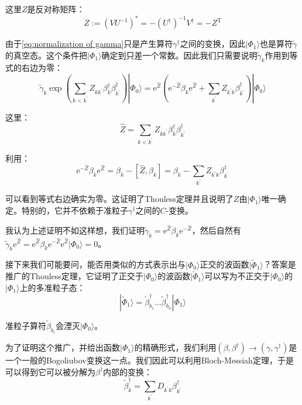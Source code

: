 这里$Z$是反对称矩阵：
\begin{equation}
Z:=(VU^{-1})^{*}=-(U^{\dagger})^{-1}V^{\dagger}=-Z^{\mathrm{T}}\label{eq:Z UV}
\end{equation}

由于\ref{eq:normalization of gamma}只是产生算符$\gamma^{\dagger}$之间的变换，因此$|\Phi_{1}\rangle$也是算符$\tilde{\gamma}$的真空态。这个条件把$|\Phi_{1}\rangle$确定到只差一个常数。因此我们只需要说明$\tilde{\gamma}_{k}$作用到等式的右边为零：
\[
\tilde{\gamma}_{k}\exp\left(\sum_{k<k^{\prime}}Z_{kk^{\prime}}\beta^{\dagger}_{k}\beta^{\dagger}_{k^{\prime}}\right)|\Phi_{0}\rangle=\mathrm{e}^{\hat{Z}}\left(\mathrm{e}^{-\hat{Z}}\beta_{k}\mathrm{e}^{\hat{Z}}+\sum_{k^{\prime}}Z_{k^{\prime}k}\beta^{\dagger}_{k^{\prime}}\right)|\Phi_{0}\rangle
\]

这里：
\[
\hat{Z}=\sum_{k<k^{\prime}}Z_{kk^{\prime}}\beta^{\dagger}_{k}\beta^{\dagger}_{k^{\prime}}
\]

利用：
\[
\mathrm{e}^{-\hat{Z}}\beta_{k}\mathrm{e}^{\hat{Z}}=\beta_{k}-[\hat{Z},\beta_{k}]=\beta_{k}-\sum_{k^{\prime}}Z_{k^{\prime}k}\beta^{\dagger}_{k^{\prime}}
\]

可以看到等式右边确实为零。这证明了Thouless定理并且说明了$Z$由$|\Phi_{1}\rangle$唯一确定。特别的，它并不依赖于准粒子$\gamma^{\dagger}$之间的$C$-变换。
\begin{booknote*}
我认为上述证明不如这样想，我们证明$\tilde{\gamma}_{k}=\mathrm{e}^{\hat{Z}}\beta_{k}\mathrm{e}^{-\hat{Z}}$，然后自然有$\tilde{\gamma}_{k}\mathrm{e}^{\hat{Z}}=\mathrm{e}^{\hat{Z}}\beta_{k}\mathrm{e}^{-\hat{Z}}\mathrm{e}^{\hat{Z}}|\Phi_{0}\rangle=0$。
\end{booknote*}
接下来我们可能要问，能否用类似的方式表示出与$|\Phi_{0}\rangle$正交的波函数$|\tilde{\Phi}_{1}\rangle$？答案是推广的Thouless定理，它证明了正交于$|\Phi_{0}\rangle$的波函数$|\tilde{\Phi}_{1}\rangle$可以写为不正交于$|\Phi_{0}\rangle$的$|\Phi_{1}\rangle$上的多准粒子态：
\begin{equation}
|\tilde{\Phi}_{1}\rangle=\tilde{\beta}^{\dagger}_{b_{1}}\dots\tilde{\beta}^{\dagger}_{b_{n}}|\Phi_{1}\rangle\label{eq:Phi1 orthogonal}
\end{equation}

准粒子算符$\tilde{\beta}_{b_{i}}$会湮灭$|\Phi_{0}\rangle$。

为了证明这个推广，并给出函数$|\Phi_{1}\rangle$的精确形式，我们利用$(\beta,\beta^{\dagger})\rightarrow(\gamma,\gamma^{\dagger})$是一个一般的Bogoliubov变换这一点。我们因此可以利用Bloch-Messiah定理，于是可以得到它可以被分解为$\beta^{\dagger}$内部的变换：
\[
\tilde{\beta}^{\dagger}_{k}=\sum_{k^{\prime}}D_{k^{\prime}k}\beta^{\dagger}_{k^{\prime}}
\]

